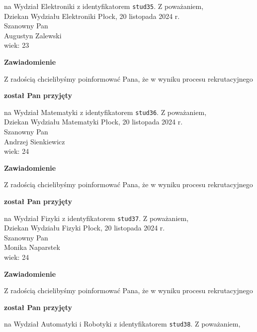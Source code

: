 \documentclass[12pt,a4paper]{article}
\begin{document}
na Wydział Elektroniki z identyfikatorem \verb|stud35|. 
\vspace{2cm}
\noindent
Z poważaniem,\\
Dziekan
Wydziału Elektroniki
\newpage
\hfill Płock, 20 listopada 2024 r.\\
\noindent 
Szanowny Pan \\
Augustyn Zalewski \\
wiek: 23
\bigskip
\begin{center}
 	{\Large\textbf{Zawiadomienie}}
\end{center}
\bigskip
Z radością chcielibyśmy poinformować Pana, że w wyniku procesu rekrutacyjnego 
\begin{center}
\textsf{\textbf{został Pan przyjęty}} 
\end{center}
na Wydział Matematyki z identyfikatorem \verb|stud36|. 
\vspace{2cm}
\noindent
Z poważaniem,\\
Dziekan
Wydziału Matematyki
\newpage
\hfill Płock, 20 listopada 2024 r.\\
\noindent 
Szanowny Pan \\
Andrzej Sienkiewicz \\
wiek: 24
\bigskip
\begin{center}
 	{\Large\textbf{Zawiadomienie}}
\end{center}
\bigskip
Z radością chcielibyśmy poinformować Pana, że w wyniku procesu rekrutacyjnego 
\begin{center}
\textsf{\textbf{został Pan przyjęty}} 
\end{center}
na Wydział Fizyki z identyfikatorem \verb|stud37|. 
\vspace{2cm}
\noindent
Z poważaniem,\\
Dziekan
Wydziału Fizyki
\newpage
\hfill Płock, 20 listopada 2024 r.\\
\noindent 
Szanowny Pan \\
Monika Naparstek \\
wiek: 24
\bigskip
\begin{center}
 	{\Large\textbf{Zawiadomienie}}
\end{center}
\bigskip
Z radością chcielibyśmy poinformować Pana, że w wyniku procesu rekrutacyjnego 
\begin{center}
\textsf{\textbf{został Pan przyjęty}} 
\end{center}
na Wydział Automatyki i Robotyki z identyfikatorem \verb|stud38|. 
\vspace{2cm}
\noindent
Z poważaniem,\\
\end{document}
